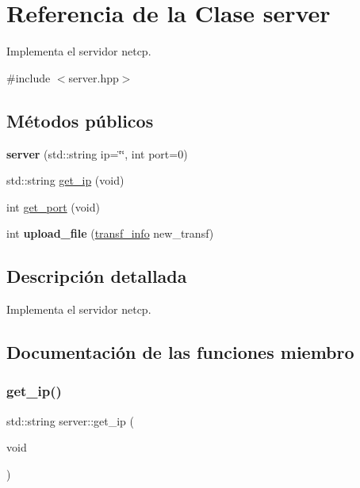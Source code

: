 \hypertarget{classserver}{}\section{Referencia de la Clase server}
\label{classserver}


Implementa el servidor netcp.  




{\ttfamily \#include $<$server.\+hpp$>$}

\subsection*{Métodos públicos}
\begin{DoxyCompactItemize}
\item 
\mbox{\label{classserver_a94f0de46df9f31016034c81e0014c06c}} 
{\bfseries server} (std\+::string ip=\char`\"{}\char`\"{}, int port=0)
\item 
std\+::string \hyperlink{classserver_aa3ffb6541d4295c59a04ca6d72a8bed4}{get\+\_\+ip} (void)
\item 
int \hyperlink{classserver_a85c34ce8e949d74f068025b11bd04bcc}{get\+\_\+port} (void)
\item 
\mbox{\label{classserver_ad7ef99cd7b0f7c529e501f34bd5d7f03}} 
int {\bfseries upload\+\_\+file} (\hyperlink{structtransf__info}{transf\+\_\+info} new\+\_\+transf)
\end{DoxyCompactItemize}


\subsection{Descripción detallada}
Implementa el servidor netcp. 

\subsection{Documentación de las funciones miembro}
\mbox{\label{classserver_aa3ffb6541d4295c59a04ca6d72a8bed4}} 
\subsubsection{\texorpdfstring{get\+\_\+ip()}{get\_ip()}}
{\footnotesize\ttfamily std\+::string server\+::get\+\_\+ip (\begin{DoxyParamCaption}\item[{void}]{ }\end{DoxyParamCaption})}

